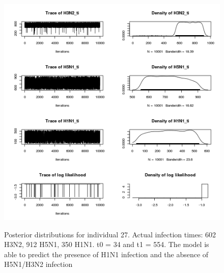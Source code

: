 \documentclass[a4paper,11pt,twoside]{article}
\begin{document}
\begin{figure}[H]
\begin{centering}
\includegraphics[scale=0.8]{27_mcmc.png}\\
\caption{Posterior distributions for individual 27. Actual infection times: 602 H3N2, 912 H5N1, 350 H1N1. t0 = 34 and t1 = 554. The model is able to predict the presence of H1N1 infection and the absence of H5N1/H3N2 infection}
\end{centering}
\end{figure}
\end{document}
